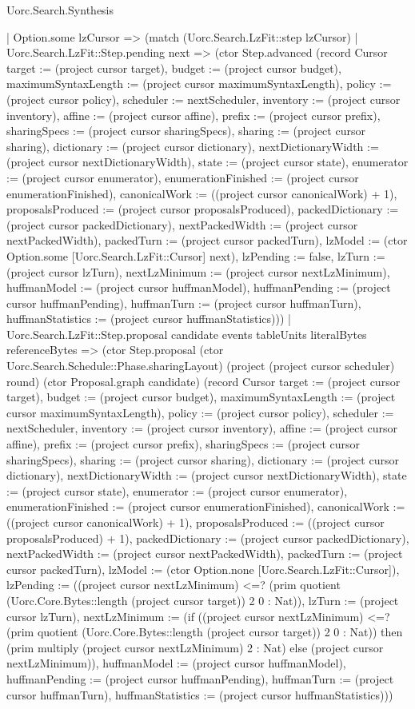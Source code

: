 \begin{lexlean}{Uorc.Search.Synthesis}
\begin{semanticmodule}
{    | Option.some lzCursor => (match (Uorc.Search.LzFit::step lzCursor)
      | Uorc.Search.LzFit::Step.pending next => (ctor Step.advanced (record Cursor {target := (project cursor target), budget := (project cursor budget), maximumSyntaxLength := (project cursor maximumSyntaxLength), policy := (project cursor policy), scheduler := nextScheduler, inventory := (project cursor inventory), affine := (project cursor affine), prefix := (project cursor prefix), sharingSpecs := (project cursor sharingSpecs), sharing := (project cursor sharing), dictionary := (project cursor dictionary), nextDictionaryWidth := (project cursor nextDictionaryWidth), state := (project cursor state), enumerator := (project cursor enumerator), enumerationFinished := (project cursor enumerationFinished), canonicalWork := ((project cursor canonicalWork) + 1), proposalsProduced := (project cursor proposalsProduced), packedDictionary := (project cursor packedDictionary), nextPackedWidth := (project cursor nextPackedWidth), packedTurn := (project cursor packedTurn), lzModel := (ctor Option.some [Uorc.Search.LzFit::Cursor] next), lzPending := false, lzTurn := (project cursor lzTurn), nextLzMinimum := (project cursor nextLzMinimum), huffmanModel := (project cursor huffmanModel), huffmanPending := (project cursor huffmanPending), huffmanTurn := (project cursor huffmanTurn), huffmanStatistics := (project cursor huffmanStatistics)}))
      | Uorc.Search.LzFit::Step.proposal candidate events tableUnits literalBytes referenceBytes => (ctor Step.proposal (ctor Uorc.Search.Schedule::Phase.sharingLayout) (project (project cursor scheduler) round) (ctor Proposal.graph candidate) (record Cursor {target := (project cursor target), budget := (project cursor budget), maximumSyntaxLength := (project cursor maximumSyntaxLength), policy := (project cursor policy), scheduler := nextScheduler, inventory := (project cursor inventory), affine := (project cursor affine), prefix := (project cursor prefix), sharingSpecs := (project cursor sharingSpecs), sharing := (project cursor sharing), dictionary := (project cursor dictionary), nextDictionaryWidth := (project cursor nextDictionaryWidth), state := (project cursor state), enumerator := (project cursor enumerator), enumerationFinished := (project cursor enumerationFinished), canonicalWork := ((project cursor canonicalWork) + 1), proposalsProduced := ((project cursor proposalsProduced) + 1), packedDictionary := (project cursor packedDictionary), nextPackedWidth := (project cursor nextPackedWidth), packedTurn := (project cursor packedTurn), lzModel := (ctor Option.none [Uorc.Search.LzFit::Cursor]), lzPending := ((project cursor nextLzMinimum) <=? (prim quotient (Uorc.Core.Bytes::length (project cursor target)) 2 0 : Nat)), lzTurn := (project cursor lzTurn), nextLzMinimum := (if ((project cursor nextLzMinimum) <=? (prim quotient (Uorc.Core.Bytes::length (project cursor target)) 2 0 : Nat)) then (prim multiply (project cursor nextLzMinimum) 2 : Nat) else (project cursor nextLzMinimum)), huffmanModel := (project cursor huffmanModel), huffmanPending := (project cursor huffmanPending), huffmanTurn := (project cursor huffmanTurn), huffmanStatistics := (project cursor huffmanStatistics)}))
}
\end{semanticmodule}
\end{lexlean}
